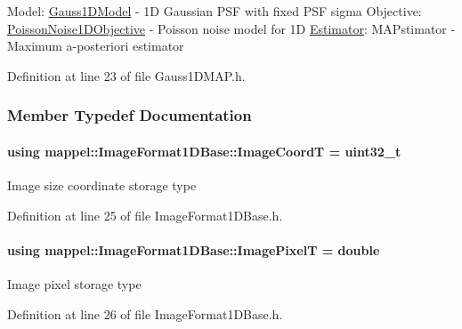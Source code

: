 Model\+: \hyperlink{classmappel_1_1Gauss1DModel}{Gauss1\+D\+Model} -\/ 1D Gaussian P\+SF with fixed P\+SF sigma Objective\+: \hyperlink{classmappel_1_1PoissonNoise1DObjective}{Poisson\+Noise1\+D\+Objective} -\/ Poisson noise model for 1D \hyperlink{classmappel_1_1Estimator}{Estimator}\+: M\+A\+Pstimator -\/ Maximum a-\/posteriori estimator 

Definition at line 23 of file Gauss1\+D\+M\+A\+P.\+h.



\subsubsection{Member Typedef Documentation}
\paragraph[{\texorpdfstring{Image\+CoordT}{ImageCoordT}}]{\setlength{\rightskip}{0pt plus 5cm}using {\bf mappel\+::\+Image\+Format1\+D\+Base\+::\+Image\+CoordT} =  uint32\+\_\+t\hspace{0.3cm}{\ttfamily [inherited]}}\hypertarget{classmappel_1_1ImageFormat1DBase_a82ab3168eb1a87eaeb3e7c919188e9fc}{}\label{classmappel_1_1ImageFormat1DBase_a82ab3168eb1a87eaeb3e7c919188e9fc}
Image size coordinate storage type 

Definition at line 25 of file Image\+Format1\+D\+Base.\+h.

\paragraph[{\texorpdfstring{Image\+PixelT}{ImagePixelT}}]{\setlength{\rightskip}{0pt plus 5cm}using {\bf mappel\+::\+Image\+Format1\+D\+Base\+::\+Image\+PixelT} =  double\hspace{0.3cm}{\ttfamily [inherited]}}\hypertarget{classmappel_1_1ImageFormat1DBase_a156fe500fd249cb4b77bdb0abc0dd0ea}{}\label{classmappel_1_1ImageFormat1DBase_a156fe500fd249cb4b77bdb0abc0dd0ea}
Image pixel storage type 

Definition at line 26 of file Image\+Format1\+D\+Base.\+h.

